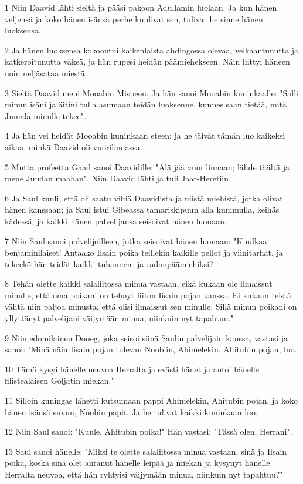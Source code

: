 \par 1 Niin Daavid lähti sieltä ja pääsi pakoon Adullamin luolaan. Ja kun hänen veljensä ja koko hänen isänsä perhe kuulivat sen, tulivat he sinne hänen luoksensa.
\par 2 Ja hänen luoksensa kokoontui kaikenlaista ahdingossa olevaa, velkaantunutta ja katkeroitunutta väkeä, ja hän rupesi heidän päämiehekseen. Näin liittyi häneen noin neljäsataa miestä.
\par 3 Sieltä Daavid meni Mooabin Mispeen. Ja hän sanoi Mooabin kuninkaalle: "Salli minun isäni ja äitini tulla asumaan teidän luoksenne, kunnes saan tietää, mitä Jumala minulle tekee".
\par 4 Ja hän vei heidät Mooabin kuninkaan eteen; ja he jäivät tämän luo kaikeksi aikaa, minkä Daavid oli vuorilinnassa.
\par 5 Mutta profeetta Gaad sanoi Daavidille: "Älä jää vuorilinnaan; lähde täältä ja mene Juudan maahan". Niin Daavid lähti ja tuli Jaar-Heretiin.
\par 6 Ja Saul kuuli, että oli saatu vihiä Daavidista ja niistä miehistä, jotka olivat hänen kanssaan; ja Saul istui Gibeassa tamariskipuun alla kummulla, keihäs kädessä, ja kaikki hänen palvelijansa seisoivat hänen luonaan.
\par 7 Niin Saul sanoi palvelijoilleen, jotka seisoivat hänen luonaan: "Kuulkaa, benjaminilaiset! Antaako Iisain poika teillekin kaikille pellot ja viinitarhat, ja tekeekö hän teidät kaikki tuhannen- ja sadanpäämiehiksi?
\par 8 Tehän olette kaikki salaliitossa minua vastaan, eikä kukaan ole ilmaissut minulle, että oma poikani on tehnyt liiton Iisain pojan kanssa. Ei kukaan teistä välitä niin paljoa minusta, että olisi ilmaissut sen minulle. Sillä minun poikani on yllyttänyt palvelijani väijymään minua, niinkuin nyt tapahtuu."
\par 9 Niin edomilainen Dooeg, joka seisoi siinä Saulin palvelijain kanssa, vastasi ja sanoi: "Minä näin Iisain pojan tulevan Noobiin, Ahimelekin, Ahitubin pojan, luo.
\par 10 Tämä kysyi hänelle neuvoa Herralta ja evästi hänet ja antoi hänelle filistealaisen Goljatin miekan."
\par 11 Silloin kuningas lähetti kutsumaan pappi Ahimelekin, Ahitubin pojan, ja koko hänen isänsä suvun, Noobin papit. Ja he tulivat kaikki kuninkaan luo.
\par 12 Niin Saul sanoi: "Kuule, Ahitubin poika!" Hän vastasi: "Tässä olen, Herrani".
\par 13 Saul sanoi hänelle: "Miksi te olette salaliitossa minua vastaan, sinä ja Iisain poika, koska sinä olet antanut hänelle leipää ja miekan ja kysynyt hänelle Herralta neuvoa, että hän ryhtyisi väijymään minua, niinkuin nyt tapahtuu?"
